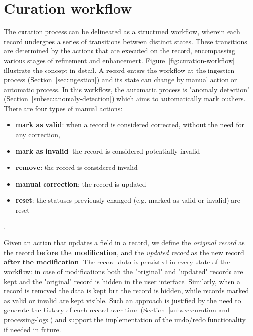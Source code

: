 \documentclass[a4paper]{article}
\begin{document}
\section{Curation workflow}
\label{sec:curation-workflow}

The curation process can be delineated as a structured workflow, wherein each record undergoes a series of transitions between distinct states. 
These transitions are determined by the actions that are executed on the record, encompassing various stages of refinement and enhancement. 
Figure~\ref{fig:curation-workflow} illustrate the concept in detail.
A record enters the workflow at the ingestion process (Section~\ref{sec:ingestion}) and its state can change by manual action or automatic process. 
In this workflow, the automatic process is "anomaly detection" (Section~\ref{subsec:anomaly-detection}) which aims to automatically mark outliers. 
There are four types of manual actions: 
\begin{itemize}
    \item \textbf{mark as valid}: when a record is considered corrected, without the need for any correction, 
    \item \textbf{mark as invalid}: the record is considered potentially invalid
    \item \textbf{remove}: the record is considered invalid
    \item \textbf{manual correction}: the record is updated 
    \item \textbf{reset}: the statuses previously changed (e.g. marked as valid or invalid) are reset
\end{itemize}.

Given an action that updates a field in a record, we define the \emph{original record} as the record \textbf{before the modification}, and the \emph{updated record} as the new record \textbf{after the modification}. 
The record data is persisted in every state of the workflow: in case of modifications both the "original" and "updated" records are kept and the "original" record is hidden in the user interface.  
Similarly, when a record is removed the data is kept but the record is hidden, while records marked as valid or invalid are kept visible. 
Such an approach is justified by the need to generate the history of each record over time (Section~\ref{subsec:curation-and-processing-logs}) and support the implementation of the undo/redo functionality if needed in future. 
\end{document}
